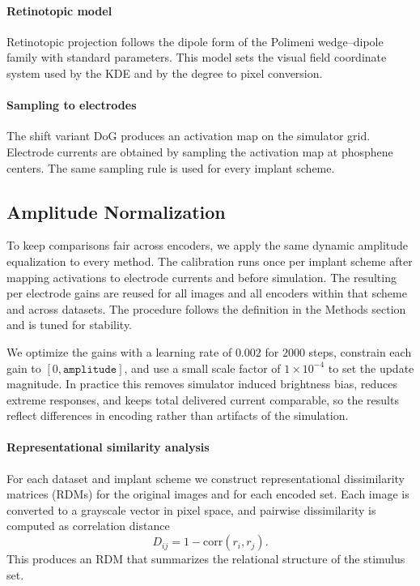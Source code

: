 \paragraph{Retinotopic model}
Retinotopic projection follows the dipole form of the Polimeni wedge–dipole family with standard parameters. This model sets the visual field coordinate system used by the KDE and by the degree to pixel conversion.

\paragraph{Sampling to electrodes}
The shift variant DoG produces an activation map on the simulator grid. Electrode currents are obtained by sampling the activation map at phosphene centers. The same sampling rule is used for every implant scheme.

\subsection{Amplitude Normalization}
To keep comparisons fair across encoders, we apply the same dynamic amplitude equalization to every method. The calibration runs once per implant scheme after mapping activations to electrode currents and before simulation. The resulting per electrode gains are reused for all images and all encoders within that scheme and across datasets. The procedure follows the definition in the Methods section and is tuned for stability.

We optimize the gains with a learning rate of \(0.002\) for \(2000\) steps, constrain each gain to \([0,\texttt{amplitude}]\), and use a small scale factor of \(1\times10^{-4}\) to set the update magnitude. In practice this removes simulator induced brightness bias, reduces extreme responses, and keeps total delivered current comparable, so the results reflect differences in encoding rather than artifacts of the simulation.

\paragraph{Representational similarity analysis}
For each dataset and implant scheme we construct representational dissimilarity matrices (RDMs) for the original images and for each encoded set. 
Each image is converted to a grayscale vector in pixel space, and pairwise dissimilarity is computed as correlation distance
\[
D_{ij} = 1 - \mathrm{corr}(r_i, r_j).
\]
This produces an RDM that summarizes the relational structure of the stimulus set. 

